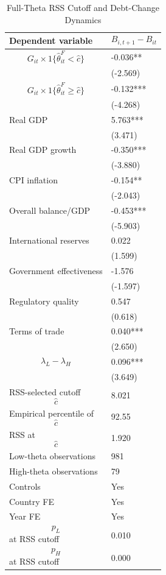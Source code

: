 \begin{table}[H]\centering
\begin{threeparttable}
\caption{Full-Theta RSS Cutoff and Debt-Change Dynamics}
\label{tab:deltaB_rss_cutoff_fulltheta}
\scriptsize
\begin{tabularx}{\textwidth}{lY}
\toprule
Dependent variable & $$B_{i,t+1}-B_{it}$$ \\
\midrule
$$G_{it}\times 1\{\widehat{\theta}^{F}_{it}<\widehat{c}\}$$ & -0.036** \\
 & (-2.569) \\
$$G_{it}\times 1\{\widehat{\theta}^{F}_{it}\geq\widehat{c}\}$$ & -0.132*** \\
 & (-4.268) \\
Real GDP & 5.763*** \\
 & (3.471) \\
Real GDP growth & -0.350*** \\
 & (-3.880) \\
CPI inflation & -0.154** \\
 & (-2.043) \\
Overall balance/GDP & -0.453*** \\
 & (-5.903) \\
International reserves & 0.022 \\
 & (1.599) \\
Government effectiveness & -1.576 \\
 & (-1.597) \\
Regulatory quality & 0.547 \\
 & (0.618) \\
Terms of trade & 0.040*** \\
 & (2.650) \\
$$\lambda_L-\lambda_H$$ & 0.096*** \\
 & (3.649) \\
\midrule
RSS-selected cutoff $$\widehat{c}$$ & 8.021 \\
Empirical percentile of $$\widehat{c}$$ & 92.55 \\
RSS at $$\widehat{c}$$ & 1.920 \\
Low-theta observations & 981 \\
High-theta observations & 79 \\
Controls & Yes \\
Country FE & Yes \\
Year FE & Yes \\
$$p_L$$ at RSS cutoff & 0.010 \\
$$p_H$$ at RSS cutoff & 0.000 \\

\end{tabularx}
\end{threeparttable}
\end{table}
